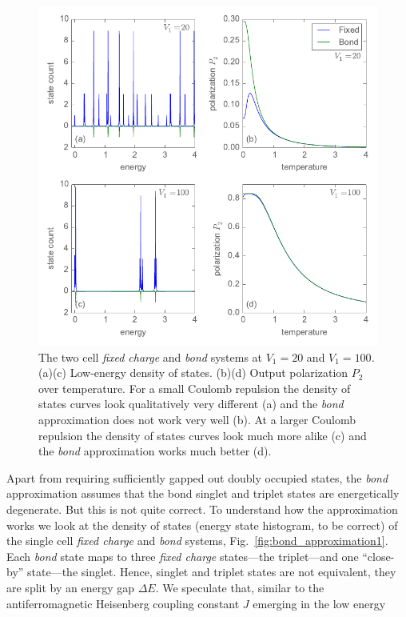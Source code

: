 \begin{figure}
  \center
  \includegraphics{bond_approximation2}
  \caption{The two cell \emph{fixed charge} and \emph{bond} systems at $V_1 =
  20$ and $V_1 = 100$. (a)(c) Low-energy density of states. (b)(d) Output
  polarization $P_2$ over temperature. For a small Coulomb repulsion the density
  of states curves look qualitatively very different (a) and the \emph{bond}
  approximation does not work very well (b). At a larger Coulomb repulsion the
  density of states curves look much more alike (c) and the \emph{bond}
  approximation works much better (d).}
  \label{fig:bond_approximation2}
\end{figure}
%
Apart from requiring sufficiently gapped out doubly occupied states, the
\emph{bond} approximation assumes that the bond singlet and triplet states are
energetically degenerate. But this is not quite correct. To understand
how the approximation works we look at the density of states (energy state
histogram, to be correct) of the single cell \emph{fixed charge} and \emph{bond}
systems, Fig.~\ref{fig:bond_approximation1}. Each \emph{bond} state maps to
three \emph{fixed charge} states---the triplet---and one ``close-by''
state---the singlet. Hence, singlet and triplet states are not equivalent, they
are split by an energy gap $\Delta E$. We speculate that, similar to the
antiferromagnetic Heisenberg coupling constant $J$ emerging in the low energy
